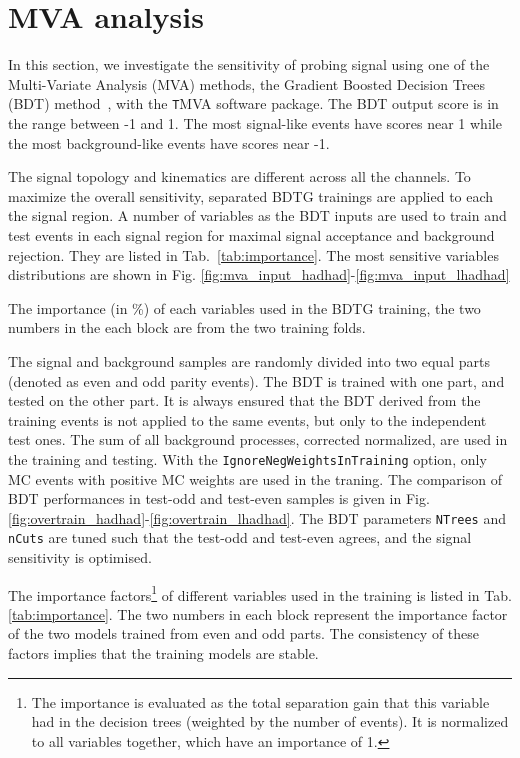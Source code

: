 \section{MVA analysis}
\label{sec:mva}

In this section, we investigate the sensitivity of probing signal using one of the Multi-Variate Analysis (MVA) methods, the Gradient Boosted Decision Trees (BDT) method~\cite{BDT,BDT2}, with the {\texttt TMVA} software package. The BDT output score is in the range between -1 and 1. The most signal-like events have scores near 1 while the most background-like events have scores near -1.

The signal topology and kinematics are different across all the channels. To maximize the overall sensitivity, separated BDTG trainings are applied to each the signal region. A number of variables as the BDT inputs are used to train and test events in each signal region for maximal signal acceptance and background rejection. They are listed in Tab.~\ref{tab:importance}. The most sensitive variables distributions are shown in Fig. \ref{fig:mva_input_hadhad}-\ref{fig:mva_input_lhadhad}

\begin{table}
\label{tab:importance}
\caption{The importance (in \%) of each variables used in the BDTG training, the two numbers in the each block are from the two training folds.}

\end{table}

The signal and background samples are randomly divided into two equal parts (denoted as even and odd parity events). The BDT is trained with one part, and tested on the other part. It is always ensured that the BDT derived from the training events is not applied to the same events, but only to the independent test ones. The sum of all background processes, corrected normalized, are used in the training and testing. %
With the \texttt{IgnoreNegWeightsInTraining} option, only MC events with positive MC weights are used in the traning. The comparison of BDT performances in test-odd and test-even samples is given in Fig. \ref{fig:overtrain_hadhad}-\ref{fig:overtrain_lhadhad}. The BDT parameters \texttt{NTrees} and \texttt{nCuts} are tuned such that the test-odd and test-even agrees, and the signal sensitivity is optimised.

The importance factors\footnote{
The importance is evaluated as the total separation gain that this variable had in the decision trees (weighted by the number of events). It is normalized to all variables together, which have an importance of 1.
}
of different variables used in the training is listed in Tab. \ref{tab:importance}. The two numbers in each block represent the importance factor of the two models trained from even and odd parts. The consistency of these factors implies that the training models are stable.


